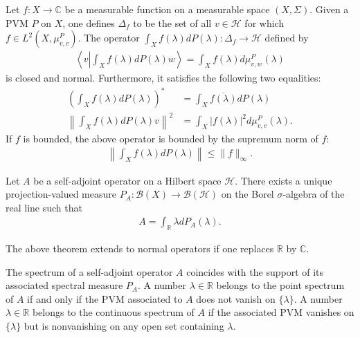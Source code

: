     \begin{property}
        Let $f:X\rightarrow\mathbb{C}$ be a measurable function on a measurable space $(X,\Sigma)$. Given a PVM $P$ on $X$, one defines $\Delta_f$ to be the set of all $v\in\mathcal{H}$ for which $f\in L^2(X, \mu^P_{v,v})$. The operator $\int_Xf(\lambda)dP(\lambda):\Delta_f\rightarrow\mathcal{H}$ defined by
        \begin{gather}
            \left\langle v\left|\int_Xf(\lambda)dP(\lambda)w\right.\right\rangle = \int_Xf(\lambda)d\mu^P_{v,w}(\lambda)
        \end{gather}
        is closed and normal. Furthermore, it satisfies the following two equalities:
        \begin{align}
            \left(\int_Xf(\lambda)dP(\lambda)\right)^* &= \int_X\overline{f(\lambda)}dP(\lambda)\\
            \left\|\int_Xf(\lambda)dP(\lambda)v\right\|^2 &= \int_X|f(\lambda)|^2d\mu^P_{v,v}(\lambda).
        \end{align}
        If $f$ is bounded, the above operator is bounded by the supremum norm of $f$:
        \begin{gather}
            \left\|\int_Xf(\lambda)dP(\lambda)\right\|\leq\|f\|_\infty.
        \end{gather}
    \end{property}

    \begin{theorem}
        Let $A$ be a self-adjoint operator on a Hilbert space $\mathcal{H}$. There exists a unique projection-valued measure $P_A:\mathcal{B}(X)\rightarrow\mathcal{B}(\mathcal{H})$ on the Borel $\sigma$-algebra of the real line such that
        \begin{gather}
            A = \int_{\mathbb{R}}\lambda dP_A(\lambda).
        \end{gather}
    \end{theorem}
    \begin{remark}
        The above theorem extends to normal operators if one replaces $\mathbb{R}$ by $\mathbb{C}$.
    \end{remark}
    \begin{property}
        The spectrum of a self-adjoint operator $A$ coincides with the support of its associated spectral measure $P_A$. A number $\lambda\in\mathbb{R}$ belongs to the point spectrum of $A$ if and only if the PVM associated to $A$ does not vanish on $\{\lambda\}$. A number $\lambda\in\mathbb{R}$ belongs to the continuous spectrum of $A$ if the associated PVM vanishes on $\{\lambda\}$ but is nonvanishing on any open set containing $\lambda$.
    \end{property}

